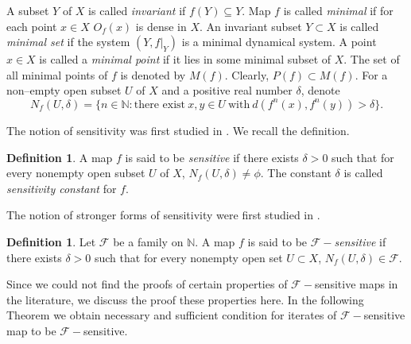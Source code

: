 \documentclass{amsart}[12pt, papera4]
\theoremstyle{definition}
\newtheorem{definition}[theorem]{Definition}
\theoremstyle{remark}
\numberwithin{equation}{section}
\def\N{{\mathbb N}}
\def\F{{\mathscr{F}}}
\begin{document}
\smallskip
\noindent A subset $Y$ of $X$ is called \emph{invariant} if $f(Y)\subseteq Y$. Map $f$ is called \emph{minimal} if for each point $x\in X$ $O_f(x)$ is dense in $X$. An invariant subset $Y\subset X$ is called \emph{minimal set} if the system $(Y,f|_Y)$ is a minimal dynamical system. A point $x\in X$ is called a \emph{minimal point} if it lies in some minimal subset of $X$. The set of all minimal points of $f$ is denoted by $M(f)$. Clearly, $P(f)\subset M(f)$. For a non--empty open subset $U$ of $X$ and a positive real number $\delta$, denote $$ {N_f (U,\delta)=\{n \in \mathbb{N}:\mbox{there exist}\ x, y \in U \  \mbox{with} \  d(f^{n}(x),f^{n}(y))>\delta\}.} $$ 

\smallskip	
\noindent The notion of sensitivity was first studied in \cite{AY}. We recall the definition.
\begin{definition}
	A map $f$ is said to be \emph{sensitive} if there exists $\delta>0$ such that for every nonempty open subset $U$ of $X$, $N_f (U,\delta)\neq \phi$. The constant $\delta$ is called \emph{sensitivity constant} for $f$.
\end{definition}

\smallskip
\noindent		The notion of stronger forms of sensitivity were first studied in \cite{TKS}. 
\begin{definition}
	Let $\mathscr{F}$ be a family on $\N$. A map $f$ is said to be \emph{$\mathscr{F}-$sensitive} if there exists $\delta > 0$ such that for every nonempty open set $U \subset X$, $N_f (U,\delta)\in \mathscr{F}$. 
\end{definition}

\medskip
\noindent Since we could not find the proofs of certain properties of $\F-$sensitive maps in the literature, we discuss the proof these properties here. In the following Theorem we obtain necessary and sufficient condition for iterates of $\F-$sensitive map to be $\F-$sensitive. 
\medskip
\end{document}
